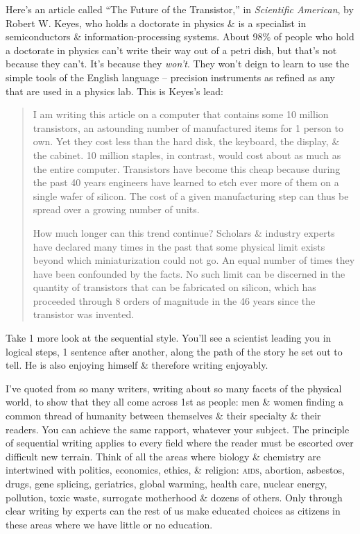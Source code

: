 \documentclass{article}
\begin{document}
Here's an article called ``The Future of the Transistor,'' in \textit{Scientific American}, by Robert W. Keyes, who holds a doctorate in physics \& is a specialist in semiconductors \& information-processing systems. About 98\% of people who hold a doctorate in physics can't write their way out of a petri dish, but that's not because they can't. It's because they \textit{won't}. They won't deign to learn to use the simple tools of the English language -- precision instruments as refined as any that are used in a physics lab. This is Keyes's lead:
\begin{quotation}
	I am writing this article on a computer that contains some 10 million transistors, an astounding number of manufactured items for 1 person to own. Yet they cost less than the hard disk, the keyboard, the display, \& the cabinet. 10 million staples, in contrast, would cost about as much as the entire computer. Transistors have become this cheap because during the past 40 years engineers have learned to etch ever more of them on a single wafer of silicon. The cost of a given manufacturing step can thus be spread over a growing number of units.
	
	How much longer can this trend continue? Scholars \& industry experts have declared many times in the past that some physical limit exists beyond which miniaturization could not go. An equal number of times they have been confounded by the facts. No such limit can be discerned in the quantity of transistors that can be fabricated on silicon, which has proceeded through 8 orders of magnitude in the 46 years since the transistor was invented.
\end{quotation}
Take 1 more look at the sequential style. You'll see a scientist leading you in logical steps, 1 sentence after another, along the path of the story he set out to tell. He is also enjoying himself \& therefore writing enjoyably.

I've quoted from so many writers, writing about so many facets of the physical world, to show that they all come across 1st as people: men \& women finding a common thread of humanity between themselves \& their specialty \& their readers. You can achieve the same rapport, whatever your subject. The principle of sequential writing applies to every field where the reader must be escorted over difficult new terrain. Think of all the areas where biology \& chemistry are intertwined with politics, economics, ethics, \& religion: \textsc{aids}, abortion, asbestos, drugs, gene splicing, geriatrics, global warming, health care, nuclear energy, pollution, toxic waste, surrogate motherhood \& dozens of others. Only through clear writing by experts can the rest of us make educated choices as citizens in these areas where we have little or no education.
\end{document}
